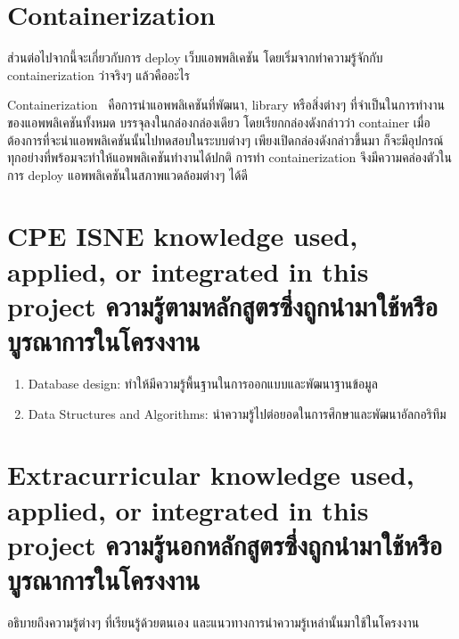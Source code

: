 
\section{Containerization}
ส่วนต่อไปจากนี้จะเกี่ยวกับการ deploy เว็บแอพพลิเคชัน โดยเริ่มจากทำความรู้จักกับ 
containerization ว่าจริงๆ แล้วคืออะไร

Containerization~\cite{ctnrh} คือการนำแอพพลิเคชันที่พัฒนา, library หรือสิ่งต่างๆ ที่จำเป็นในการทำงานของแอพพลิเคชันทั้งหมด บรรจุลงในกล่องกล่องเดียว โดยเรียกกล่องดังกล่าวว่า container 
เมื่อต้องการที่จะนำแอพพลิเคชันนั้นไปทดสอบในระบบต่างๆ เพียงเปิดกล่องดังกล่าวขึ้นมา
ก็จะมีอุปกรณ์ทุกอย่างที่พร้อมจะทำให้แอพพลิเคชันทำงานได้ปกติ การทำ containerization 
จึงมีความคล่องตัวในการ deploy แอพพลิเคชันในสภาพแวดล้อมต่างๆ ได้ดี 

\section{\ifenglish%
\ifcpe CPE \else ISNE \fi knowledge used, applied, or integrated in this project
\else%
ความรู้ตามหลักสูตรซึ่งถูกนำมาใช้หรือบูรณาการในโครงงาน
\fi
}
\begin{enumerate}
  \item Database design: ทำให้มีความรู้พื้นฐานในการออกแบบและพัฒนาฐานข้อมูล
  \item Data Structures and Algorithms: นำความรู้ไปต่อยอดในการศึกษาและพัฒนาอัลกอริทึม
\end{enumerate}


\section{\ifenglish%
Extracurricular knowledge used, applied, or integrated in this project
\else%
ความรู้นอกหลักสูตรซึ่งถูกนำมาใช้หรือบูรณาการในโครงงาน
\fi
}

อธิบายถึงความรู้ต่างๆ ที่เรียนรู้ด้วยตนเอง และแนวทางการนำความรู้เหล่านั้นมาใช้ในโครงงาน
